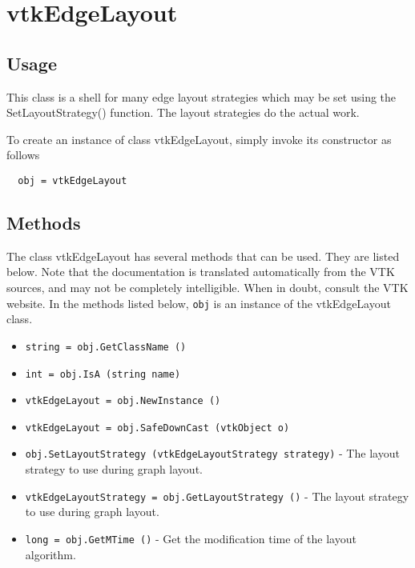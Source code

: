 \section{vtkEdgeLayout}

\subsection{Usage}

 This class is a shell for many edge layout strategies which may be set
 using the SetLayoutStrategy() function.  The layout strategies do the
 actual work.

To create an instance of class vtkEdgeLayout, simply
invoke its constructor as follows
\begin{verbatim}
  obj = vtkEdgeLayout
\end{verbatim}
\subsection{Methods}

The class vtkEdgeLayout has several methods that can be used.
  They are listed below.
Note that the documentation is translated automatically from the VTK sources,
and may not be completely intelligible.  When in doubt, consult the VTK website.
In the methods listed below, \verb|obj| is an instance of the vtkEdgeLayout class.
\begin{itemize}
\item  \verb|string = obj.GetClassName ()|

\item  \verb|int = obj.IsA (string name)|

\item  \verb|vtkEdgeLayout = obj.NewInstance ()|

\item  \verb|vtkEdgeLayout = obj.SafeDownCast (vtkObject o)|

\item  \verb|obj.SetLayoutStrategy (vtkEdgeLayoutStrategy strategy)| -  The layout strategy to use during graph layout.

\item  \verb|vtkEdgeLayoutStrategy = obj.GetLayoutStrategy ()| -  The layout strategy to use during graph layout.

\item  \verb|long = obj.GetMTime ()| -  Get the modification time of the layout algorithm.

\end{itemize}
